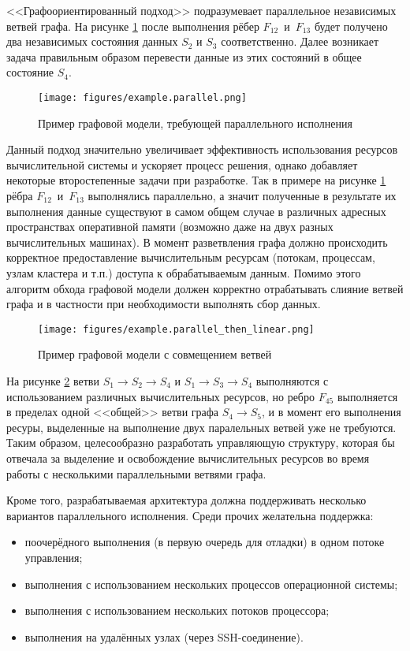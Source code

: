 <<Графоориентированный подход>> подразумевает параллельное независимых ветвей графа. На рисунке \ref{fig:parallelExample} после выполнения рёбер $F_{12}$~и~$F_{13}$ будет получено два независимых состояния данных $S_2$ и $S_3$ соответственно. Далее возникает задача правильным образом перевести данные из этих состояний в общее состояние $S_4$.
\begin{figure}[!ht]
    \centering
    \texttt{[image: figures/example.parallel.png]}
    \caption{Пример графовой модели, требующей параллельного исполнения}
    \label{fig:parallelExample}
\end{figure}

Данный подход значительно увеличивает эффективность использования ресурсов вычислительной системы и ускоряет процесс решения, однако добавляет некоторые второстепенные задачи при разработке. Так в примере на рисунке \ref{fig:parallelExample} рёбра $F_{12}$~и~$F_{13}$ выполнялись параллельно, а значит полученные в результате их выполнения данные существуют в самом общем случае в различных адресных пространствах оперативной памяти (возможно даже на двух разных вычислительных машинах). В момент разветвления графа должно происходить корректное предоставление вычислительным ресурсам (потокам, процессам, узлам кластера и т.п.) доступа к обрабатываемым данным. Помимо этого алгоритм обхода графовой модели должен корректно отрабатывать слияние ветвей графа и в частности при необходимости выполнять сбор данных.

\begin{figure}[!ht]
    \centering
    \texttt{[image: figures/example.parallel\_then\_linear.png]}
    \caption{Пример графовой модели с совмещением ветвей}
    \label{fig:parallelThenLinearExample}
\end{figure}

На рисунке \ref{fig:parallelThenLinearExample} ветви $S_1 \rightarrow S_2 \rightarrow S_4$ и $S_1 \rightarrow S_3 \rightarrow S_4$ выполняются с использованием различных вычислительных ресурсов, но ребро $F_{45}$ выполняется в пределах одной <<общей>> ветви графа $S_4 \rightarrow S_5$, и в момент его выполнения ресуры, выделенные на выполнение двух паралельных ветвей уже не требуются. Таким образом, целесообразно разработать управляющую структуру, которая бы отвечала за выделение и освобождение вычислительных ресурсов во время работы с несколькими параллельными ветвями графа.

Кроме того, разрабатываемая архитектура должна поддерживать несколько вариантов параллельного исполнения. Среди прочих желательна поддержка:
\begin{itemize}
    \item поочерёдного выполнения (в первую очередь для отладки) в одном потоке управления;
    \item выполнения с использованием нескольких процессов операционной системы;
    \item выполнения с использованием нескольких потоков процессора;
    \item выполнения на удалённых узлах (через SSH-соединение).
\end{itemize}

